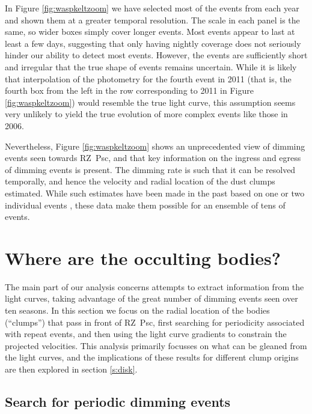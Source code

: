 \documentclass[]{rsos}
\begin{document}
In Figure \ref{fig:waspkeltzoom} we have selected most of the events from each year and
shown them at a greater temporal resolution. The scale in each panel is the same, so
wider boxes simply cover longer events. Most events appear to last at least a few days,
suggesting that only having nightly coverage does not seriously hinder our ability to
detect most events. However, the events are sufficiently short and irregular that the
true shape of events remains uncertain. While it is likely that interpolation of the
photometry for the fourth event in 2011 (that is, the fourth box from the left in the row
corresponding to 2011 in Figure \ref{fig:waspkeltzoom}) would resemble the true light
curve, this assumption seems very unlikely to yield the true evolution of more complex
events like those in 2006.

Nevertheless, Figure \ref{fig:waspkeltzoom} shows an unprecedented view of dimming events
seen towards RZ~Psc, and that key information on the ingress and egress of dimming events
is present. The dimming rate is such that it can be resolved temporally, and hence the
velocity and radial location of the dust clumps estimated. While such estimates have been
made in the past based on one or two individual events \cite{1985PZ.....22..181Z}, these
data make them possible for an ensemble of tens of events.

\section{Where are the occulting bodies?}\label{s:where}

The main part of our analysis concerns attempts to extract information from the light
curves, taking advantage of the great number of dimming events seen over ten seasons. In
this section we focus on the radial location of the bodies (``clumps'') that pass in
front of RZ~Psc, first searching for periodicity associated with repeat events, and then
using the light curve gradients to constrain the projected velocities. This analysis
primarily focusses on what can be gleaned from the light curves, and the implications of
these results for different clump origins are then explored in section \ref{s:disk}.

\subsection{Search for periodic dimming events}\label{ss:per}
\end{document}
